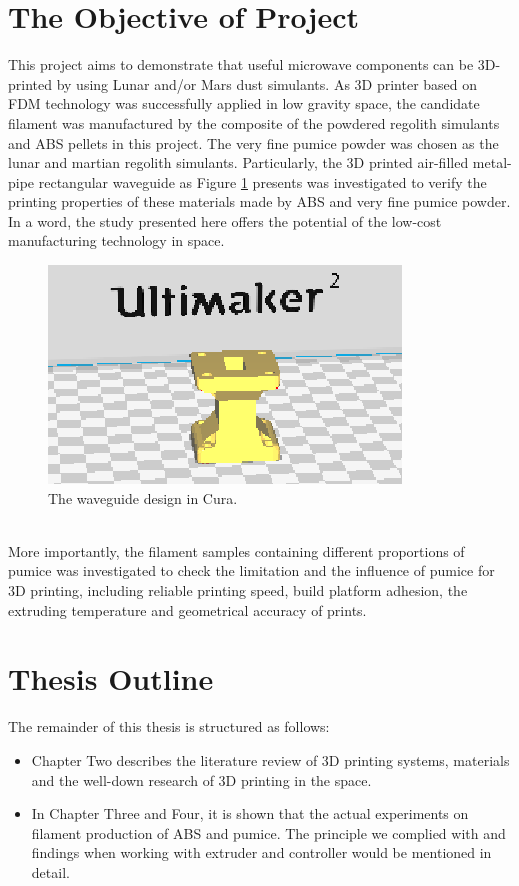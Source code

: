\section{The Objective of Project}
This project aims to demonstrate that useful microwave components can be 3D-printed by using Lunar and/or Mars dust simulants. As 3D printer based on FDM technology was successfully applied in low gravity space, the candidate filament was manufactured by the composite of the powdered regolith simulants and ABS pellets in this project. The very fine pumice powder was chosen as the lunar and martian regolith simulants. Particularly, the 3D printed air-filled metal-pipe rectangular waveguide as Figure \ref{Fig:waveguide} presents was investigated to verify the printing properties of these materials made by ABS and very fine pumice powder. In a word, the study presented here offers the potential of the low-cost manufacturing technology in space.\\
\begin{figure}[htbp]
  \centering
  \includegraphics[scale=1.2]{Figs//waveguide_design.PNG}
  \caption[The waveguide design in Cura]{\footnotesize The waveguide design in Cura.}
  \label{Fig:waveguide}
\end{figure}
\\
More importantly, the filament samples containing different proportions of pumice was investigated to check the limitation and the influence of pumice for 3D printing, including reliable printing speed, build platform adhesion, the extruding temperature and geometrical accuracy of prints. 

\section{Thesis Outline}

The remainder of this thesis is structured as follows:
\begin{itemize}
\item Chapter Two describes the literature review of 3D printing systems, materials and the well-down research of 3D printing in the space.
\end{itemize}
\begin{itemize}
\item In Chapter Three and Four, it is shown that the actual experiments on filament production of ABS and pumice. The principle we complied with and findings when working with extruder and controller would be mentioned in detail.
\end{itemize}

